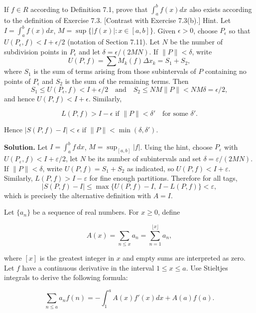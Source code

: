 \begin{problembox}
If $f \in R$ according to Definition 7.1, prove that $\int_a^b f(x) dx$ also exists according to the definition of Exercise 7.3. [Contrast with Exercise 7.3(b).] Hint. Let $I = \int_a^b f(x) dx$, $M = \sup \{ |f(x)| : x \in [a, b] \}$. Given $\epsilon > 0$, choose $P_\epsilon$ so that $U(P_\epsilon, f) < I + \epsilon/2$ (notation of Section 7.11). Let $N$ be the number of subdivision points in $P_\epsilon$ and let $\delta = \epsilon/(2MN)$. If $\|P\| < \delta$, write 
\[U(P, f) = \sum M_k(f) \Delta x_k = S_1 + S_2,\]
where $S_1$ is the sum of terms arising from those subintervals of $P$ containing no points of $P_\epsilon$ and $S_2$ is the sum of the remaining terms. Then
\[S_1 \leq U(P_\epsilon, f) < I + \epsilon/2 \quad \text{and} \quad S_2 \leq NM \|P\| < NM\delta = \epsilon/2,\]
and hence $U(P, f) < I + \epsilon$. Similarly,

\[ L(P, f) > I - \epsilon \text{ if } \|P\| < \delta' \quad \text{for some } \delta'. \]

Hence $|S(P, f) - I| < \epsilon \text{ if } \|P\| < \min (\delta, \delta')$.
\end{problembox}

\noindent\textbf{Solution.}
Let $I=\int_a^b f\,dx$, $M=\sup_{[a,b]}|f|$. Using the hint, choose $P_\varepsilon$ with $U(P_\varepsilon,f)<I+\varepsilon/2$, let $N$ be its number of subintervals and set $\delta=\varepsilon/(2MN)$. If $\|P\|<\delta$, write $U(P,f)=S_1+S_2$ as indicated, so $U(P,f)<I+\varepsilon$. Similarly, $L(P,f)>I-\varepsilon$ for fine enough partitions. Therefore for all tags,
\[|S(P,f)-I|\le \max\{U(P,f)-I,\ I-L(P,f)\}<\varepsilon,
\]
which is precisely the alternative definition with $A=I$.
\medskip

\begin{problembox}
Let $\{a_n\}$ be a sequence of real numbers. For $x \geq 0$, define

\[ A(x) = \sum_{n \leq x} a_n = \sum_{n=1}^{\lfloor x \rfloor} a_n, \]

where $[x]$ is the greatest integer in $x$ and empty sums are interpreted as zero. Let $f$ have a continuous derivative in the interval $1 \leq x \leq a$. Use Stieltjes integrals to derive the following formula:

\[ \sum_{n \leq a} a_n f(n) = -\int_1^a A(x) f'(x) dx + A(a) f(a). \]
\end{problembox}

